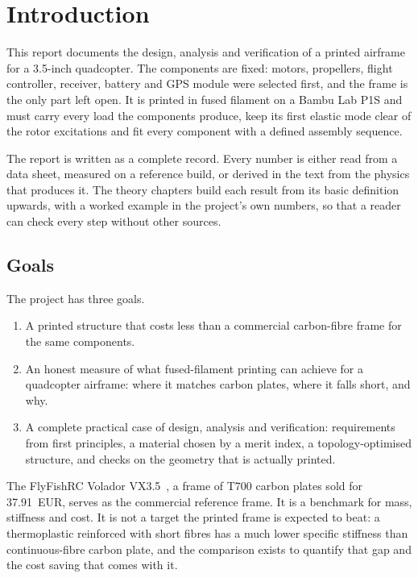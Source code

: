 \chapter{Introduction}\label{sec:introduction}

This report documents the design, analysis and verification of a printed airframe for a 3.5-inch quadcopter. The components are fixed: motors, propellers, flight controller, receiver, battery and GPS module were selected first, and the frame is the only part left open. It is printed in fused filament on a Bambu Lab P1S and must carry every load the components produce, keep its first elastic mode clear of the rotor excitations and fit every component with a defined assembly sequence.

The report is written as a complete record. Every number is either read from a data sheet, measured on a reference build, or derived in the text from the physics that produces it. The theory chapters build each result from its basic definition upwards, with a worked example in the project's own numbers, so that a reader can check every step without other sources.

\section{Goals}\label{sec:intro-goals}

The project has three goals.
\begin{enumerate}
\item A printed structure that costs less than a commercial carbon-fibre frame for the same components.
\item An honest measure of what fused-filament printing can achieve for a quadcopter airframe: where it matches carbon plates, where it falls short, and why.
\item A complete practical case of design, analysis and verification: requirements from first principles, a material chosen by a merit index, a topology-optimised structure, and checks on the geometry that is actually printed.
\end{enumerate}

The FlyFishRC Volador VX3.5~\citep{volador}, a frame of T700 carbon plates sold for \SI{37.91}{EUR}, serves as the commercial reference frame. It is a benchmark for mass, stiffness and cost. It is not a target the printed frame is expected to beat: a thermoplastic reinforced with short fibres has a much lower specific stiffness than continuous-fibre carbon plate, and the comparison exists to quantify that gap and the cost saving that comes with it.

